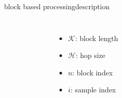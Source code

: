         \begin{frame}{block based processing}{description}
            \vspace{-4mm}

            \begin{columns}
                    \vspace{-11mm}
                    \begin{figure}
                        \centering
                        	
                    \end{figure}
                    \begin{itemize}
                        \item   $\mathcal{K}$: block length
                        \item   $\mathcal{H}$: hop size
                        \item   $n$: block index
                        \item   $i$: sample index
                    \end{itemize}
            \end{columns}
        \end{frame}
        
